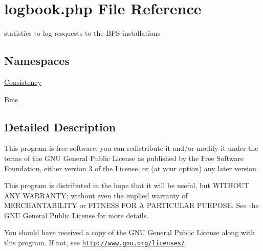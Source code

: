 \hypertarget{logbook_8php}{}\section{logbook.\+php File Reference}
\label{logbook_8php}


statistics to log resquests to the B\+PS installations  


\subsection*{Namespaces}
\begin{DoxyCompactItemize}
\item 
 \hyperlink{namespace_consistency}{Consistency}
\item 
 \hyperlink{namespace_bms}{Bms}
\end{DoxyCompactItemize}


\subsection{Detailed Description}
This program is free software\+: you can redistribute it and/or modify it under the terms of the G\+NU General Public License as published by the Free Software Foundation, either version 3 of the License, or (at your option) any later version.

This program is distributed in the hope that it will be useful, but W\+I\+T\+H\+O\+UT A\+NY W\+A\+R\+R\+A\+N\+TY; without even the implied warranty of M\+E\+R\+C\+H\+A\+N\+T\+A\+B\+I\+L\+I\+TY or F\+I\+T\+N\+E\+SS F\+OR A P\+A\+R\+T\+I\+C\+U\+L\+AR P\+U\+R\+P\+O\+SE. See the G\+NU General Public License for more details.

You should have received a copy of the G\+NU General Public License along with this program. If not, see \href{http://www.gnu.org/licenses/}{\tt http\+://www.\+gnu.\+org/licenses/}. 